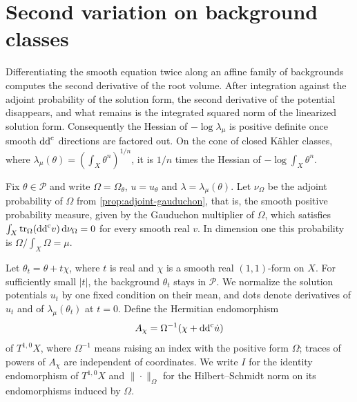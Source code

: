 \section{Second variation on background classes}
\label{sec:gaud-volume-hessian}

Differentiating the smooth equation twice along an affine family of backgrounds computes the second derivative of the root volume. After integration against the adjoint probability of the solution form, the second derivative of the potential disappears, and what remains is the integrated squared norm of the linearized solution form. Consequently the Hessian of $-\log\lambda_\mu$ is positive definite once smooth $\mathrm{dd}^{\mathrm{c}}$ directions are factored out. On the cone of closed K\"ahler classes, where $\lambda_\mu(\theta)=(\int_X\theta^n)^{1/n}$, it is $1/n$ times the Hessian of $-\log\int_X\theta^n$.

Fix $\theta\in\mathscr P$ and write $\Omega=\Omega_\theta$, $u=u_\theta$ and $\lambda=\lambda_\mu(\theta)$. Let $\nu_\Omega$ be the adjoint probability of $\Omega$ from \cref{prop:adjoint-gauduchon}, that is, the smooth positive probability measure, given by the Gauduchon multiplier of $\Omega$, which satisfies $\int_X\operatorname{tr}_\Omega(\mathrm{dd}^{\mathrm{c}} v)\,\mathrm{d}\nu_\Omega=0$ for every smooth real $v$. In dimension one this probability is $\Omega/\int_X\Omega=\mu$.

Let $\theta_t=\theta+t\chi$, where $t$ is real and $\chi$ is a smooth real $(1,1)$-form on $X$. For sufficiently small $|t|$, the background $\theta_t$ stays in $\mathscr P$. We normalize the solution potentials $u_t$ by one fixed condition on their mean, and dots denote derivatives of $u_t$ and of $\lambda_\mu(\theta_t)$ at $t=0$. Define the Hermitian endomorphism
\[
 A_\chi=\Omega^{-1}(\chi+\mathrm{dd}^{\mathrm{c}}\dot u)
\]
of $T^{1,0}X$, where $\Omega^{-1}$ means raising an index with the positive form $\Omega$; traces of powers of $A_\chi$ are independent of coordinates. We write $I$ for the identity endomorphism of $T^{1,0}X$ and $\|\cdot\|_\Omega$ for the Hilbert--Schmidt norm on its endomorphisms induced by $\Omega$.

